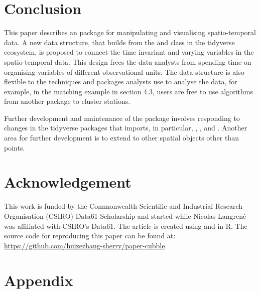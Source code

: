 \documentclass[
]{jss}
\begin{document}
\hypertarget{conclusion}{%
\section{Conclusion}\label{conclusion}}

This paper describes an  package  for
manipulating and visualising spatio-temporal data. A new data structure,
 that builds from the  and
 class in the tidyverse ecosystem, is proposed to
connect the time invariant and varying variables in the spatio-temporal
data. This design frees the data analysts from spending time on
organising variables of different observational units. The data
structure is also flexible to the techniques and packages analysts use
to analyse the data, for example, in the matching example in section
4.3, users are free to use algorithms from another package to cluster
stations.

Further development and maintenance of the package involves responding
to changes in the tidyverse packages that  imports, in
particular, , , and . Another area for
further development is to extend  to other spatial objects
other than points.

\newpage

\hypertarget{acknowledgement}{%
\section{Acknowledgement}\label{acknowledgement}}

This work is funded by the Commonwealth Scientific and Industrial
Research Organisation (CSIRO) Data61 Scholarship and started while
Nicolas Langrené was affiliated with CSIRO's Data61. The article is
created using  \citep{knitr} and 
\citep{rmarkdown} in R. The source code for reproducing this paper can
be found at: \url{https://github.com/huizezhang-sherry/paper-cubble}.

\hypertarget{appendix}{%
\section{Appendix}\label{appendix}}
\end{document}
